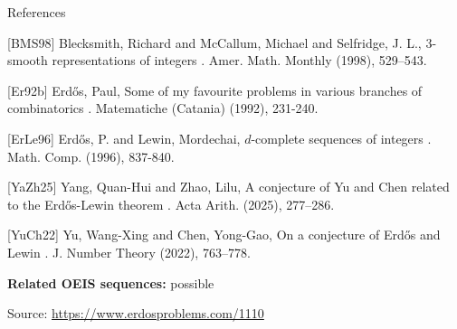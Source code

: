 \documentclass{article}
\begin{document}
References

[BMS98] Blecksmith, Richard and McCallum, Michael and Selfridge, J. L., {$3$}-smooth representations of integers . Amer. Math. Monthly (1998), 529--543.

[Er92b] Erd\H{o}s, Paul, Some of my favourite problems in various branches of combinatorics . Matematiche (Catania) (1992), 231-240.

[ErLe96] Erd\H{o}s, P. and Lewin, Mordechai, $d$-complete sequences of integers . Math. Comp. (1996), 837-840.

[YaZh25] Yang, Quan-Hui and Zhao, Lilu, A conjecture of {Y}u and {C}hen related to the {E}rd\H os-{L}ewin theorem . Acta Arith. (2025), 277--286.

[YuCh22] Yu, Wang-Xing and Chen, Yong-Gao, On a conjecture of {E}rd\H{o}s and {L}ewin . J. Number Theory (2022), 763--778.

\noindent\textbf{Related OEIS sequences:} possible


\bigskip
\noindent\small{Source: \url{https://www.erdosproblems.com/1110}}
\end{document}
